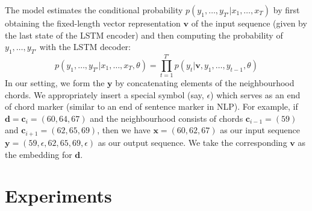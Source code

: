 \documentclass{article}
\newcommand{\N}{\mathcal{N}}
\newcommand{\T}{\mathcal{T}}
\newcommand{\boldc}{\boldsymbol c}
\newcommand{\boldd}{\boldsymbol d}
\newcommand{\boldy}{\boldsymbol y}
\newcommand{\boldx}{\boldsymbol x}
\begin{document}
The model estimates the conditional probability $p(y_1,\ldots,y_{T'} | x_1, \ldots, x_T)$ by first obtaining the fixed-length vector representation $\boldsymbol{v}$ of the input sequence (given by the last state of the LSTM encoder) and then computing the probability of $y_1,\ldots,y_{T'} $ with the LSTM decoder: 
%
\begin{equation}
p(y_1,\ldots,y_{T'} | x_1, \ldots, x_T,\theta) = \prod_{t=1}^{T'} p(y_t|\boldsymbol{v}, y_1,\ldots,y_{t-1},\theta)
\end{equation}
%
%
In our setting, we form the $\boldsymbol{y}$ by concatenating elements of the neighbourhood chords. We appropriately insert a special symbol (say, $\epsilon$) which serves as an end of chord marker (similar to an end of sentence marker in NLP). For example, if $\boldd=\boldc_i=(60,64,67)$ and the neighbourhood consists of chords $\boldc_{i-1}=(59)$ and $\boldc_{i+1}=(62,65,69)$, then we have $\boldx=(60,62,67)$ as our input sequence $\boldy=(59,\epsilon,62,65,69,\epsilon)$ as our output sequence. We take the corresponding $\boldsymbol{v}$ as the embedding for $\boldd$.
%
%
%
%
\section{Experiments}
\label{sec:experiments}
\end{document}
